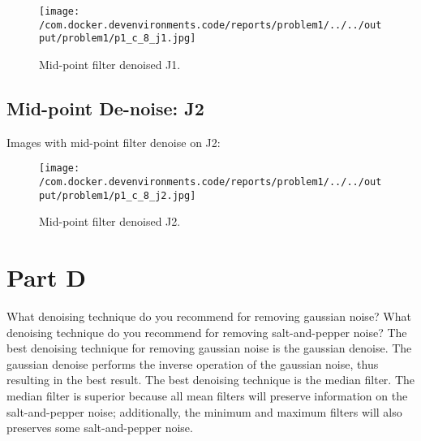 \documentclass{article}%
\begin{document}
\begin{figure}[h!]%
\centering%
\texttt{[image: /com.docker.devenvironments.code/reports/problem1/../../output/problem1/p1\_c\_8\_j1.jpg]}%
\caption{Mid{-}point filter denoised J1.}%
\end{figure}

%
\subsection{Mid{-}point De{-}noise: J2}%
\label{subsec:Mid{-}pointDe{-}noiseJ2}%
Images with mid{-}point filter denoise on J2:%


\begin{figure}[h!]%
\centering%
\texttt{[image: /com.docker.devenvironments.code/reports/problem1/../../output/problem1/p1\_c\_8\_j2.jpg]}%
\caption{Mid{-}point filter denoised J2.}%
\end{figure}

%
\section{Part D}%
\label{sec:PartD}%
What denoising technique do you recommend for removing gaussian noise? What denoising technique do you recommend for removing salt{-}and{-}pepper noise?%
 The best denoising technique for removing gaussian noise is the gaussian denoise. The gaussian denoise performs the inverse operation of the gaussian noise, thus resulting in the best result.%
 The best denoising technique is the median filter. The median filter is superior because all mean filters will preserve information on the salt{-}and{-}pepper noise; additionally, the minimum and maximum filters will also preserves some salt{-}and{-}pepper noise.

%
\end{document}
